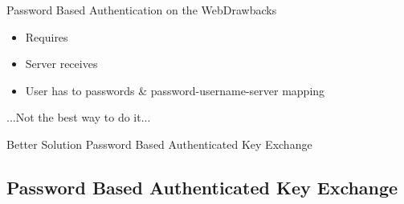 \documentclass[notes]{beamer}
\begin{document}
\begin{frame}{Password Based Authentication on the Web}{Drawbacks}
	\begin{itemize}
		\item Requires 
		\item Server receives 
		\item User has to  passwords \& password-username-server mapping
	\end{itemize}
	\pause 
	\vspace*{2em}	
	
	\begin{beamerboxesrounded}[upper=uppercol,lower=lowercol,shadow=true]{\centering }\centering
		...Not the best way to do it...
	\end{beamerboxesrounded}
	
	\pause 
	\vspace*{2em}	
	
	\begin{beamerboxesrounded}[upper=uppercol,lower=lowercol,shadow=true]{\centering Better Solution}\centering
		Password Based Authenticated Key Exchange
	\end{beamerboxesrounded}
	
\end{frame}

\subsection{Password Based Authenticated Key Exchange}
\end{document}
